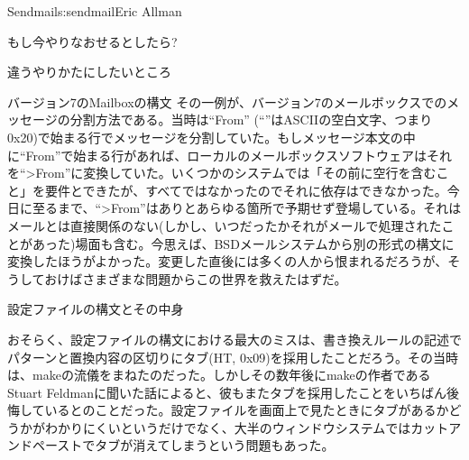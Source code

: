 \begin{aosachapter}{Sendmail}{s:sendmail}{Eric Allman}
\begin{aosasect1}{もし今やりなおせるとしたら?}
\begin{aosasect2}{違うやりかたにしたいところ}
\begin{aosasect3}{バージョン7のMailboxの構文}
その一例が、バージョン7のメールボックスでのメッセージの分割方法である。当時は``From\textvisiblespace'' (``\textvisiblespace''はASCIIの空白文字、つまり0x20)で始まる行でメッセージを分割していた。もしメッセージ本文の中に``From\textvisiblespace''で始まる行があれば、ローカルのメールボックスソフトウェアはそれを``{\textgreater}From\textvisiblespace''に変換していた。いくつかのシステムでは「その前に空行を含むこと」を要件とできたが、すべてではなかったのでそれに依存はできなかった。今日に至るまで、``{\textgreater}From''はありとあらゆる箇所で予期せず登場している。それはメールとは直接関係のない(しかし、いつだったかそれがメールで処理されたことがあった)場面も含む。今思えば、BSDメールシステムから別の形式の構文に変換したほうがよかった。変更した直後には多くの人から恨まれるだろうが、そうしておけばさまざまな問題からこの世界を救えたはずだ。

\end{aosasect3}

\begin{aosasect3}{設定ファイルの構文とその中身}

おそらく、設定ファイルの構文における最大のミスは、書き換えルールの記述でパターンと置換内容の区切りにタブ(HT, 0x09)を採用したことだろう。その当時は、makeの流儀をまねたのだった。しかしその数年後にmakeの作者であるStuart Feldmanに聞いた話によると、彼もまたタブを採用したことをいちばん後悔しているとのことだった。設定ファイルを画面上で見たときにタブがあるかどうかがわかりにくいというだけでなく、大半のウィンドウシステムではカットアンドペーストでタブが消えてしまうという問題もあった。


\end{aosasect3}
\end{aosasect2}
\end{aosasect1}
\end{aosachapter}
